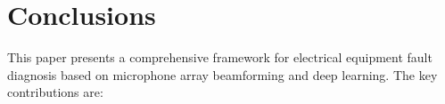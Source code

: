 \documentclass[journal]{IEEEtran}
\begin{document}





\section{Conclusions}
\label{conclusion}
This paper presents a comprehensive framework for electrical equipment fault diagnosis based on microphone array beamforming and deep learning. The key contributions are:
\end{document}
